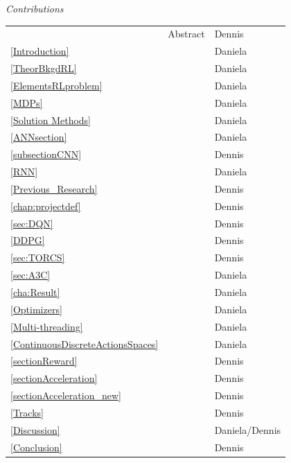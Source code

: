 \newpage
\begin{center}
	\textsl{\HUGE Contributions}
\end{center}
\begin{table}[H]
	\begin{tabular}{lll}
		& Abstract & Dennis \\
		\ref{Introduction} & \nameref{Introduction} & Daniela \\
		\ref{TheorBkgdRL} & \nameref{TheorBkgdRL} & Daniela \\
		\ref{ElementsRLproblem} & \nameref{ElementsRLproblem} & Daniela \\
		\ref{MDPs} & \nameref{MDPs} & Daniela \\
		\ref{Solution Methods} & \nameref{Solution Methods} & Daniela \\
		\ref{ANNsection} & \nameref{ANNsection} & Daniela \\
		\ref{subsectionCNN} & \nameref{subsectionCNN} & Dennis \\
		\ref{RNN} & \nameref{RNN} & Daniela \\
		\ref{Previous_Research} & \nameref{Previous_Research} & Dennis \\
		\ref{chap:projectdef} & \nameref{chap:projectdef} & Dennis \\
		\ref{sec:DQN} & \nameref{sec:DQN} & Dennis \\
		\ref{DDPG} & \nameref{DDPG} & Dennis \\
		\ref{sec:TORCS} & \nameref{sec:TORCS} & Dennis \\
		\ref{sec:A3C} & \nameref{sec:A3C} & Daniela \\
		\ref{cha:Result} & \nameref{cha:Result} & Daniela \\
		\ref{Optimizers} & \nameref{Optimizers} & Daniela \\
		\ref{Multi-threading} & \nameref{Multi-threading} & Daniela \\
		\ref{ContinuousDiscreteActionsSpaces} & \nameref{ContinuousDiscreteActionsSpaces} & Daniela \\
		\ref{sectionReward} & \nameref{sectionReward} & Dennis \\
		\ref{sectionAcceleration} & \nameref{sectionAcceleration} & Dennis \\
		\ref{sectionAcceleration_new} & \nameref{sectionAcceleration_new} & Dennis \\
		\ref{Tracks} & \nameref{Tracks} & Dennis \\
		\ref{Discussion} & \nameref{Discussion} & Daniela/Dennis  \\
		\ref{Conclusion} & \nameref{Conclusion} & Dennis  
	\end{tabular}
\end{table}